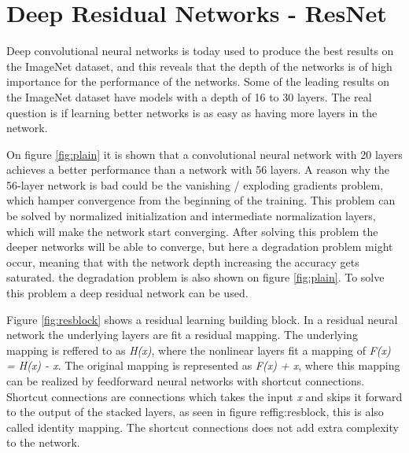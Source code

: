 \section{Deep Residual Networks - ResNet}

Deep convolutional neural networks is today used to produce the best results on the ImageNet dataset, and this reveals that the depth of the networks is of high importance for the performance of the networks\citep{RESNET}. Some of the leading results on the ImageNet dataset have models with a depth of 16 to 30 layers. The real question is if learning better networks is as easy as having more layers in the network.


On figure \ref{fig:plain} it is shown that a convolutional neural network with 20 layers achieves a better performance than a network with 56 layers. A reason why the 56-layer network is bad could be the vanishing / exploding gradients problem, which hamper convergence from the beginning of the training. This problem can be solved by normalized initialization and intermediate normalization layers, which will make the network start converging. After solving this problem the deeper networks will be able to converge, but here a degradation problem might occur, meaning that with the network depth increasing the accuracy gets saturated. the degradation problem is also shown on figure \ref{fig:plain}. To solve this problem a deep residual network can be used.


Figure \ref{fig:resblock} shows a residual learning building block. In a residual neural network the underlying layers are fit a residual mapping. The underlying mapping is reffered to as \emph{H(x)}, where the nonlinear layers fit a mapping of \emph{F(x) = H(x) - x}. The original mapping is represented as \emph{F(x) + x}, where this mapping can be realized by feedforward neural networks with shortcut connections. Shortcut connections are connections which takes the input \emph{x} and skips it forward to the output of the stacked layers, as seen in figure ref{fig:resblock}, this is also called identity mapping. The shortcut connections does not add extra complexity to the network.